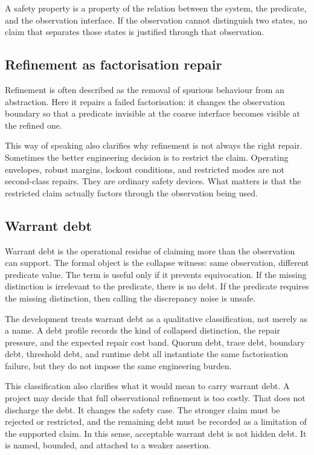 \documentclass[a4paper,11pt]{article}
\begin{document}
A safety property is a property of the relation between the system, the
predicate, and the observation interface. If the observation cannot distinguish
two states, no claim that separates those states is justified through that
observation.

\subsection{Refinement as factorisation repair}

Refinement is often described as the removal of spurious behaviour from an
abstraction. Here it repairs a failed factorisation: it changes the observation
boundary so that a predicate invisible at the coarse interface becomes visible
at the refined one.

This way of speaking also clarifies why refinement is not always the right
repair. Sometimes the better engineering decision is to restrict the claim.
Operating envelopes, robust margins, lockout conditions, and restricted modes
are not second-class repairs. They are ordinary safety devices. What matters is
that the restricted claim actually factors through the observation being used.

\subsection{Warrant debt}

Warrant debt is the operational residue of claiming more than the observation
can support.  The formal object is the collapse witness: same observation,
different predicate value.  The term is useful only if it prevents
equivocation.  If the missing distinction is irrelevant to the predicate,
there is no debt.  If the predicate requires the missing distinction, then
calling the discrepancy noise is unsafe.

The development treats warrant debt as a qualitative classification,
not merely as a name.  A debt profile records the kind of collapsed
distinction, the repair pressure, and the expected repair cost band.  Quorum
debt, trace debt, boundary debt, threshold debt, and runtime debt all
instantiate the same factorisation failure, but they do not impose the same
engineering burden.

This classification also clarifies what it would mean to carry warrant debt.
A project may decide that full observational refinement is too costly.  That
does not discharge the debt.  It changes the safety case.  The stronger claim
must be rejected or restricted, and the remaining debt must be recorded as a
limitation of the supported claim.  In this sense, acceptable warrant debt is
not hidden debt.  It is named, bounded, and attached to a weaker assertion.
\end{document}
